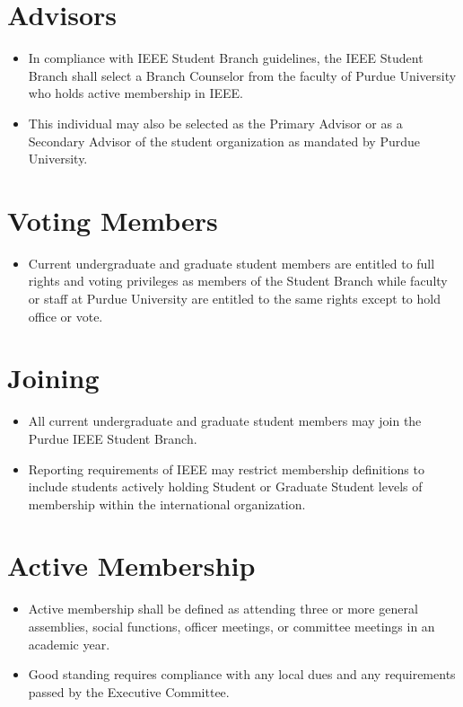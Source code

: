 \documentclass[12pt]{constitution}
\begin{document}
\section{Advisors}
\label{sec:mem_advis}
\begin{itemize}
    \item In compliance with IEEE Student Branch guidelines, the IEEE Student Branch shall select a Branch Counselor from the faculty of Purdue University who holds active membership in IEEE.
    \item This individual may also be selected as the Primary Advisor or as a Secondary Advisor of the student organization as mandated by Purdue University.
\end{itemize}

\section{Voting Members}
\label{sec:mem_vot}
\begin{itemize}
    \item Current undergraduate and graduate student members are entitled to full rights and voting privileges as members of the Student Branch while faculty or staff at Purdue University are entitled to the same rights except to hold office or vote.
\end{itemize}

\section{Joining}
\label{sec:mem_join}
\begin{itemize}
    \item All current undergraduate and graduate student members may join the Purdue IEEE Student Branch.
    \item Reporting requirements of IEEE may restrict membership definitions to include students actively holding Student or Graduate Student levels of membership within the international organization.
\end{itemize}

\section{Active Membership}
\label{sec:mem_active}
\begin{itemize}
    \item Active membership shall be defined as attending three or more general assemblies, social functions, officer meetings, or committee meetings in an academic year.
    \item Good standing requires compliance with any local dues and any requirements passed by the Executive Committee.
\end{itemize}
\end{document}
